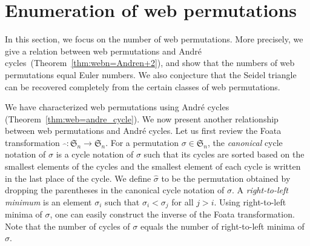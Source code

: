 \documentclass[reqno,12pt]{amsart}
\theoremstyle{definition}
\theoremstyle{remark}
\newcommand\SYM{\mathfrak{S}}
\begin{document}
\section{Enumeration of web permutations}
\label{sec:enumeration}
In this section, we focus on the number of web permutations. 
More precisely, we give a relation between web permutations and
Andr\'e cycles~(Theorem~\ref{thm:webn=Andren+2}),
and show that the numbers of web permutations equal Euler numbers.
We also conjecture that the Seidel triangle can be recovered completely from
the certain classes of web permutations.

We have characterized web permutations using Andr\'e cycles (Theorem~\ref{thm:web=andre_cycle}).
We now present another relationship between web permutations and Andr\'e cycles.
Let us first review the Foata transformation \( \widehat{~~}:\SYM_n\rightarrow\SYM_n \).
For a permutation $\sigma\in\SYM_n$, the \emph{canonical} cycle notation
of \( \sigma \) is a cycle notation of \( \sigma \) such that its cycles are
sorted based on the smallest elements of the cycles and
the smallest element of each cycle is written in the last place of the cycle.
We define \( \widehat{\sigma} \) to be the permutation obtained by dropping 
the parentheses in the canonical cycle notation of \( \sigma \).
A \emph{right-to-left minimum} is an element \( \sigma_i \) such that
\( \sigma_i < \sigma_j \) for all \( j>i \).
Using right-to-left minima of \( \sigma \), one can easily construct the inverse
of the Foata transformation.
Note that the number of cycles of \( \sigma \) equals the number of right-to-left minima of \( \widehat{\sigma} \).
\end{document}

